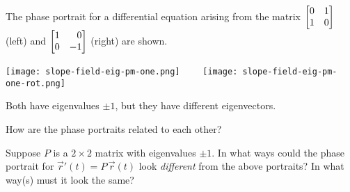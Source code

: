 \documentclass{workbook}
\begin{document}
\begin{slide}
	\question
	The phase portrait for a differential equation arising from the matrix $\mat{0&1\\1&0}$ (left)
	and $\mat{1&0\\0&-1}$ (right) are shown.
	\begin{center}
		\texttt{[image: slope-field-eig-pm-one.png]}~~~~
		\texttt{[image: slope-field-eig-pm-one-rot.png]}
	\end{center}

	Both have eigenvalues $\pm 1$, but they have different eigenvectors.

	\begin{parts}
		\item How are the phase portraits related to each other?
		\item Suppose $P$ is a $2\times 2$ matrix with eigenvalues $\pm 1$. In what ways could
		the phase portrait for $\vec r'(t) = P\,\vec r(t)$ look \emph{different} from the above portraits?
		In what way(s) must it look the same?
	\end{parts}
\end{slide}
\end{document}

